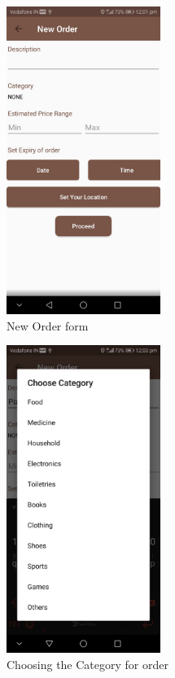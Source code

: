 \documentclass{report}
\begin{document}
\begin{figure}[h!]
\begin{subfigure}[h!]{.3\textwidth}
\centering
\includegraphics[width=5cm]{empty_form.jpg}
\caption{\centering New Order form}
\end{subfigure}
\begin{subfigure}[h!]{.3\textwidth}
\centering
\includegraphics[width=5cm]{categories.jpg}
\caption{\centering Choosing the Category for order}
\end{subfigure}
\begin{subfigure}[h!]{.3\textwidth}
\centering

\end{subfigure}
\end{figure}
\end{document}

